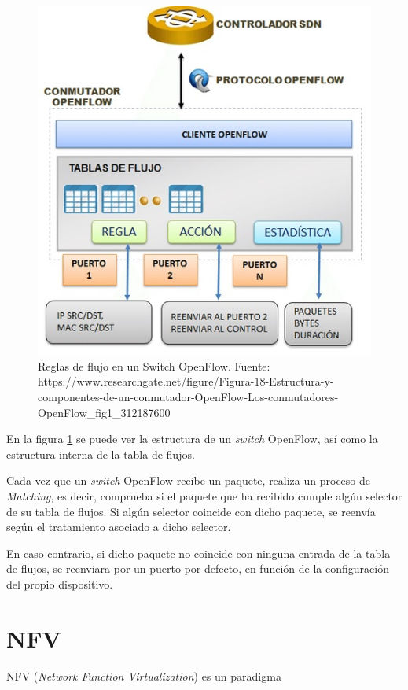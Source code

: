 \begin{figure}[!ht]
	\centering
	\includegraphics[width=0.7\linewidth]{imagenes/flujosOpenflow}
	\caption{Reglas de flujo en un Switch OpenFlow. Fuente: https://www.researchgate.net/figure/Figura-18-Estructura-y-componentes-de-un-conmutador-OpenFlow-Los-conmutadores-OpenFlow\_fig1\_312187600}
	\label{fig:flujosopenflow}
\end{figure}

\clearpage

En la figura \ref{fig:flujosopenflow} se puede ver la estructura de un \textit{switch} OpenFlow, así como la estructura interna de la tabla de flujos.

Cada vez que un \textit{switch} OpenFlow recibe un paquete, realiza un proceso de \textit{Matching}, es decir, comprueba si el paquete que ha recibido cumple algún selector de su tabla de flujos. Si algún selector coincide con dicho paquete, se reenvía según el tratamiento asociado a dicho selector.

En caso contrario, si dicho paquete no coincide con ninguna entrada de la tabla de flujos, se reenviara por un puerto por defecto, en función de la configuración del propio dispositivo.


\section{NFV}
\label{sec:nfv}

NFV (\textit{Network Function Virtualization}) es un paradigma

\cleardoublepage